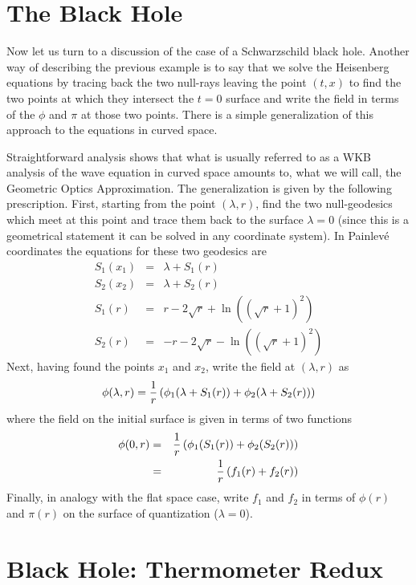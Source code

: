 \documentclass[12pt]{article}
\begin{document}
\section{The Black Hole}

Now let us turn to a discussion of the case of a Schwarzschild
black hole.  Another way of describing the previous example is to say that we
solve the Heisenberg equations by tracing back the two null-rays leaving the point
$(t,x)$ to find the two points at which they intersect the $t=0$ surface and 
write the field in terms of the $\phi$ and $\pi$ at those two points.
There is a simple generalization of this approach to the equations in curved space.

Straightforward analysis shows that what is usually
referred to as a WKB analysis of the wave equation in curved space amounts
to, what we will call, the Geometric Optics Approximation.  The generalization is
given by the following prescription. First, starting from the point 
$(\lambda,r)$, find the two null-geodesics
which meet at this point and trace them back to the surface $\lambda= 0 $
(since this is a geometrical statement it can be solved in any
coordinate system).  In Painlev\'e coordinates the equations for these
two geodesics are
\begin{eqnarray}
	S_1(x_1) &=& \lambda + S_1(r)  \nonumber\\
	S_2(x_2) &=&  \lambda + S_2(r) \nonumber\\
	S_1(r) &=& r - 2\sqrt{r} + \ln((\sqrt{r}+1)^2) \nonumber\\
	S_2(r) &=& -r -2\sqrt{r} - \ln((\sqrt{r}+1)^2) 
\end{eqnarray}
Next, having found the points $x_1$ and $x_2$, write the field at $(\lambda,r)$ as
\begin{equation}
	\phi(\lambda,r) = {1 \over r} \left( \phi_1 (\lambda + S_1(r))
	+ \phi_2 ( \lambda+S_2(r) ) \right)
\end{equation}
where the field on the initial surface is given in terms of two functions
\begin{eqnarray}
\phi(0,r) &=& {1 \over r} \left( \phi_1 ( S_1(r)) + \phi_2(S_2(r)) \right)\nonumber\\
&=& {1 \over r} \left( f_1(r) + f_2(r) \right)
\end{eqnarray}
Finally, in analogy with the flat space case, write $f_1$ and $f_2$ in terms
of $\phi(r)$ and $\pi(r)$ on the surface of quantization ($\lambda=0$).

\section{Black Hole: Thermometer Redux}
\end{document}
